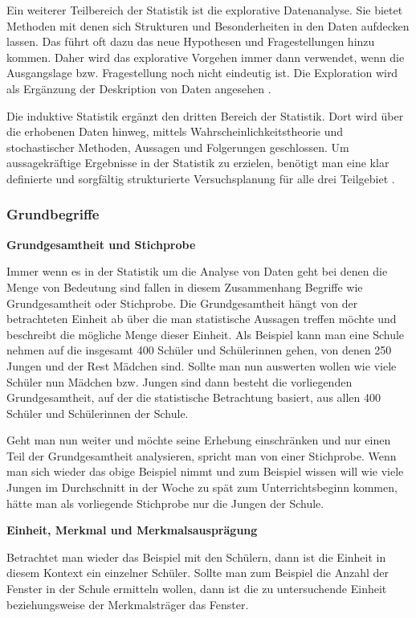 Ein weiterer Teilbereich der Statistik ist die explorative Datenanalyse. Sie bietet Methoden mit denen sich Strukturen und Besonderheiten in den Daten aufdecken lassen. Das führt oft dazu das neue Hypothesen und Fragestellungen hinzu kommen. Daher wird das explorative Vorgehen immer dann verwendet, wenn die Ausgangslage bzw. Fragestellung noch nicht eindeutig ist. Die Exploration wird als Ergänzung der Deskription von Daten angesehen \citep[vgl.][11\psq]{Fahrmeir2016}.

Die induktive Statistik ergänzt den dritten Bereich der Statistik. Dort wird über die erhobenen Daten hinweg, mittels Wahrscheinlichkeitstheorie und stochastischer Methoden, Aussagen und Folgerungen geschlossen. Um aussagekräftige Ergebnisse in der Statistik zu erzielen, benötigt man eine klar definierte und sorgfältig strukturierte Versuchsplanung für alle drei Teilgebiet \citep[vgl.][12]{Fahrmeir2016}.

\subsubsection{Grundbegriffe}
\textbf{Grundgesamtheit und Stichprobe}

Immer wenn es in der Statistik um die Analyse von Daten geht bei denen die Menge von Bedeutung sind fallen in diesem Zusammenhang Begriffe wie Grundgesamtheit oder Stichprobe. Die Grundgesamtheit hängt von der betrachteten Einheit ab über die man statistische Aussagen treffen möchte und beschreibt die mögliche Menge dieser Einheit. Als Beispiel kann man eine Schule nehmen auf die insgesamt 400 Schüler und Schülerinnen gehen, von denen 250 Jungen und der Rest Mädchen sind. Sollte man nun auswerten wollen wie viele Schüler nun Mädchen bzw. Jungen sind dann besteht die vorliegenden Grundgesamtheit, auf der die statistische Betrachtung basiert, aus allen 400 Schüler und Schülerinnen der Schule.

Geht man nun weiter und möchte seine Erhebung einschränken und nur einen Teil der Grundgesamtheit analysieren, spricht man von einer Stichprobe. Wenn man sich wieder das obige Beispiel nimmt und zum Beispiel wissen will wie viele Jungen im Durchschnitt in der Woche zu spät zum Unterrichtsbeginn kommen, hätte man als vorliegende Stichprobe nur die Jungen der Schule.

\textbf{Einheit, Merkmal und Merkmalsausprägung}

Betrachtet man wieder das Beispiel mit den Schülern, dann ist die Einheit in diesem Kontext ein einzelner Schüler. Sollte man zum Beispiel die Anzahl der Fenster in der Schule ermitteln wollen, dann ist die zu untersuchende Einheit beziehungsweise der Merkmalsträger das Fenster.

